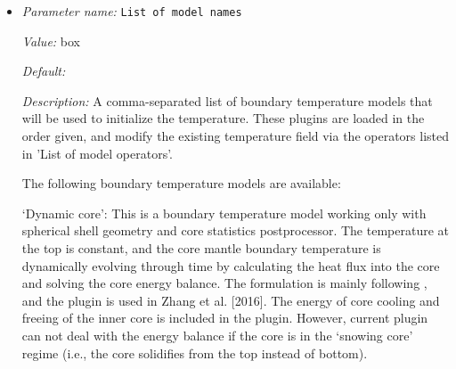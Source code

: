 \begin{itemize}
{\it Default:} 


{\it Description:} A comma separated list of names denoting those boundaries on which the temperature is fixed and described by the boundary temperature object selected in the 'List of model names' parameter. All boundary indicators used by the geometry but not explicitly listed here will end up with no-flux (insulating) boundary conditions, or, if they are listed in the 'Fixed heat flux boundary indicators', with Neumann boundary conditions.

The names of the boundaries listed here can either be numbers (in which case they correspond to the numerical boundary indicators assigned by the geometry object), or they can correspond to any of the symbolic names the geometry object may have provided for each part of the boundary. You may want to compare this with the documentation of the geometry model you use in your model.

This parameter only describes which boundaries have a fixed temperature, but not what temperature should hold on these boundaries. The latter piece of information needs to be implemented in a plugin in the BoundaryTemperature group, unless an existing implementation in this group already provides what you want.


{\it Possible values:} A list of 0 to 4294967295 elements where each element is [Any string]
\item {\it Parameter name:} {\tt List of model names}
\label{parameters:Boundary temperature model/List of model names}


{\it Value:} box


{\it Default:} 


{\it Description:} A comma-separated list of boundary temperature models that will be used to initialize the temperature. These plugins are loaded in the order given, and modify the existing temperature field via the operators listed in 'List of model operators'.

The following boundary temperature models are available:

`Dynamic core': This is a boundary temperature model working only with spherical shell geometry and core statistics postprocessor. The temperature at the top is constant, and the core mantle boundary temperature is dynamically evolving through time by calculating the heat flux into the core and solving the core energy balance. The formulation is mainly following \cite{NPB+04}, and the plugin is used in Zhang et al. [2016]. The energy of core cooling and freeing of the inner core is included in the plugin. However, current plugin can not deal with the energy balance if the core is in the `snowing core' regime (i.e., the core solidifies from the top instead of bottom).


\end{itemize}

